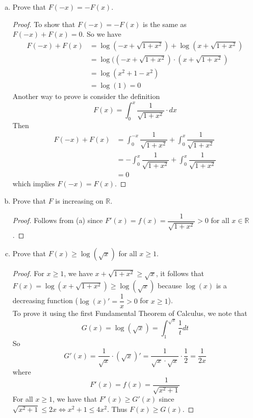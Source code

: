 \documentclass[10pt,letterpaper]{article}
\begin{document}
\begin{enumerate}[(a)]
\item Prove that $F(-x) = -F(x)$.
	\begin{proof}
	To show that $F(-x) = -F(x)$ is the same as $F(-x) + F(x) = 0$. So we have
\begin{align*}
	F(-x) + F(x) &= \log(-x + \sqrt{1 + x^2}) + \log(x + \sqrt{1 + x^2}) \\
&= \log((-x + \sqrt{1 + x^2}) \cdot (x + \sqrt{1 + x^2}) \\
&= \log(x^2 + 1 - x^2) \\ 
&= \log(1) = 0 
\end{align*}
	Another way to prove is consider the definition 
	$$F(x) = \displaystyle\int_0^x \dfrac{1}{\sqrt{1 + x^2}} \cdot dx$$
 	Then
\begin{align*}
	F(-x) + F(x) &= \displaystyle\int_{0}^{-x} \dfrac{1}{\sqrt{1 + x^2}} + 
	\displaystyle\int_{0}^{x} \dfrac{1}{\sqrt{1 + x^2}} \\
&= -\displaystyle\int_{0}^{x} \dfrac{1}{\sqrt{1 + x^2}} + 
   \displaystyle\int_{0}^{x} \dfrac{1}{\sqrt{1 + x^2}} \\
&= 0
\end{align*}
	which implies $F(-x) = F(x)$.
	\end{proof}
	
\item Prove that $F$ is increasing on $\mathbb{R}$.
	\begin{proof}
		Follows from (a) since $F'(x) = f(x) = \dfrac{1}{\sqrt{1 + x^2}} > 0$ for all
		$x \in \mathbb{R}$.
	\end{proof}
\item Prove that $F(x) \geq \log(\sqrt{x})$ for all $x \geq 1$.
	\begin{proof} 
	For $x \geq 1$, we have $x + \sqrt{1 + x^2} \geq \sqrt{x}$, it follows
	that $F(x) = \log(x + \sqrt{1 + x^2}) \geq \log(\sqrt{x})$ because 
	$\log(x)$ is a decreasing function ($\log(x)' = \dfrac{1}{x} > 0$ for $x \geq 1$). \\
	
	To prove it using the first Fundamental Theorem of Calculus, we note that
	$$G(x) = \log(\sqrt{x}) = \displaystyle\int_{1}^{\sqrt{x}} \dfrac{1}{t} dt$$
	So 
	$$G'(x) = \dfrac{1}{\sqrt{x}} \cdot (\sqrt{x})'
	= \dfrac{1}{\sqrt{x} \cdot \sqrt{x}} \cdot \dfrac{1}{2} = \dfrac{1}{2x}$$
	where 
	$$F'(x) = f(x) = \dfrac{1}{\sqrt{x^2 + 1}}$$
	For all $x \geq 1$, we have that $F'(x) \geq G'(x)$ since 
	$\sqrt{x^2 + 1} \leq 2x \Leftrightarrow x^2 + 1 \leq 4x^2$. 
	Thus $F(x) \geq G(x)$.
	
	\end{proof}


\end{enumerate}
\end{document}
